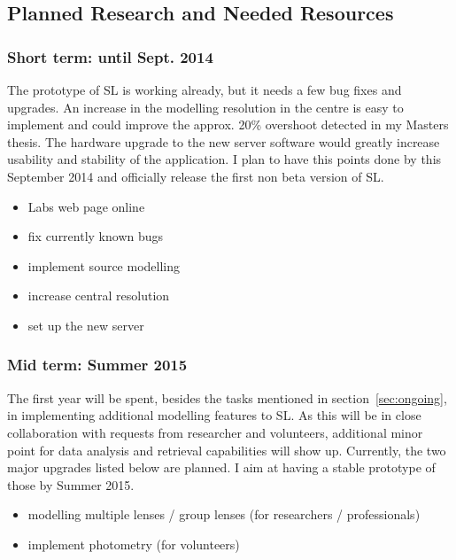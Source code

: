 \documentclass[11pt]{article}
\begin{document}
\subsection{Planned Research and Needed Resources}



\subsubsection{Short term: until Sept. 2014} \label{sec:plan_short}
The prototype of SL is working already, but it needs a few bug fixes and upgrades.
An increase in the modelling resolution in the centre is easy to implement and could improve the approx. 20\% overshoot detected in my Masters thesis.
The hardware upgrade to the new server software would greatly increase usability and stability of the application.
I plan to have this points done by this September 2014 and officially release the first non beta version of SL.

\begin{itemize}
  \item Labs web page online
  \item fix currently known bugs
  \item implement source modelling
  \item increase central resolution
  \item set up the new server
\end{itemize}


\subsubsection{Mid term: Summer 2015}

The first year will be spent, besides the tasks mentioned in section~\ref{sec:ongoing}, in implementing additional modelling features to SL.
As this will be in close collaboration with requests from researcher and volunteers, additional minor point for data analysis and retrieval capabilities will show up.
Currently, the two major upgrades listed below are planned. I aim at having a stable prototype of those by Summer 2015.

\begin{itemize}
  \item modelling multiple lenses / group lenses (for researchers / professionals)
  \item implement photometry (for volunteers)
\end{itemize}
\end{document}
